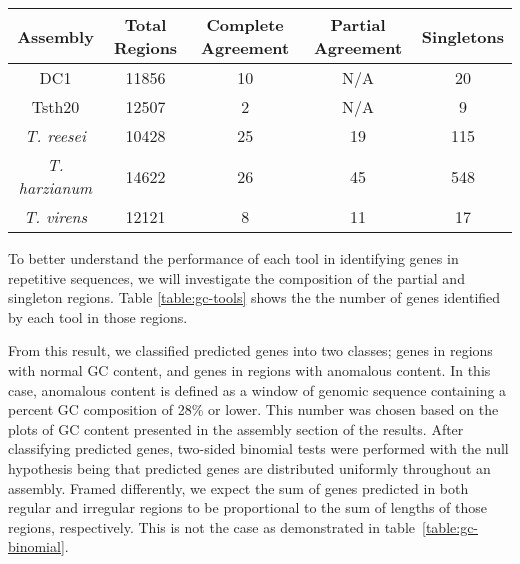 \begin{table}
  \begin{center}
    \begin{tabular}{|c|c|c|c|c|}
      Assembly & Total Regions & Complete Agreement & Partial Agreement & Singletons \\ \hline
      DC1 & 11856 & 10 & N/A & 20  \\ \hline
      Tsth20 & 12507 & 2 & N/A & 9  \\ \hline
      \textit{T. reesei} & 10428 & 25 & 19 & 115  \\ \hline
      \textit{T. harzianum} & 14622 & 26 & 45 & 548  \\ \hline
      \textit{T. virens} & 12121 & 8 & 11 & 17  \\ \hline
    \end{tabular}
  \end{center}
  \label{table:gc-regions}
\end{table}

To better understand the performance of each tool in identifying genes
in repetitive sequences, we will investigate the composition of the
partial and singleton regions. Table \ref{table:gc-tools} shows the
the number of genes identified by each tool in those regions.



From this result, we classified predicted genes into two classes;
genes in regions with normal GC content, and genes in regions with
anomalous content. In this case, anomalous content is defined as a
window of genomic sequence containing a percent GC composition of 28\%
or lower. This number was chosen based on the plots of GC content
presented in the assembly section of the results. After classifying
predicted genes, two-sided binomial tests were performed with the null
hypothesis being that predicted genes are distributed uniformly
throughout an assembly. Framed differently, we expect the sum of genes
predicted in both regular and irregular regions to be proportional to
the sum of lengths of those regions, respectively. This is not the
case as demonstrated in table~\ref{table:gc-binomial}.

